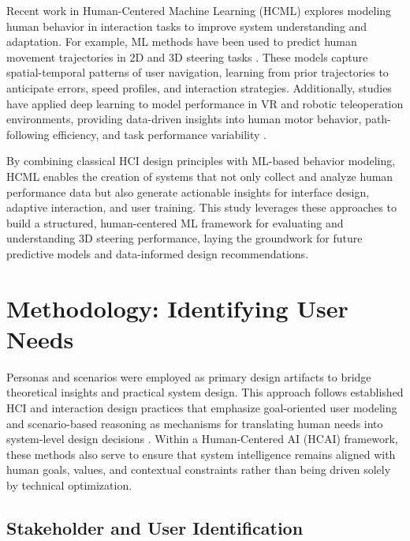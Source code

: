 \documentclass[sigconf]{acmart}
\begin{document}
Recent work in Human-Centered Machine Learning (HCML) explores modeling human behavior in interaction tasks to improve system understanding and adaptation. For example, ML methods have been used to predict human movement trajectories in 2D and 3D steering tasks \cite{alahi2016social, gupta2018social, kim2021human}. These models capture spatial-temporal patterns of user navigation, learning from prior trajectories to anticipate errors, speed profiles, and interaction strategies. Additionally, studies have applied deep learning to model performance in VR and robotic teleoperation environments, providing data-driven insights into human motor behavior, path-following efficiency, and task performance variability \cite{murali2020human, ma2022trajectory}.

By combining classical HCI design principles with ML-based behavior modeling, HCML enables the creation of systems that not only collect and analyze human performance data but also generate actionable insights for interface design, adaptive interaction, and user training. This study leverages these approaches to build a structured, human-centered ML framework for evaluating and understanding 3D steering performance, laying the groundwork for future predictive models and data-informed design recommendations.







\section{Methodology: Identifying User Needs}

Personas and scenarios were employed as primary design artifacts to bridge theoretical insights and practical system design. This approach follows established HCI and interaction design practices that emphasize goal-oriented user modeling and scenario-based reasoning as mechanisms for translating human needs into system-level design decisions \cite{sharp2019interaction, cooper2014aboutface}. Within a Human-Centered AI (HCAI) framework, these methods also serve to ensure that system intelligence remains aligned with human goals, values, and contextual constraints rather than being driven solely by technical optimization.

\subsection{Stakeholder and User Identification}
\end{document}
